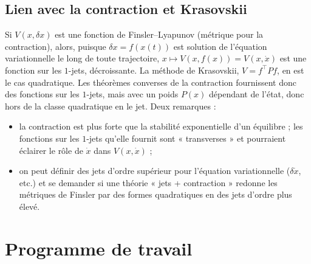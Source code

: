 \documentclass[11pt,a4paper]{article}
\theoremstyle{definition}
\theoremstyle{remark}
\newcommand{\tr}{^{\top}}
\begin{document}
\subsection{Lien avec la contraction et Krasovskii}
Si $V(x,\delta x)$ est une fonction de Finsler–Lyapunov \cite{FS,AJP} (métrique pour la contraction), alors, puisque $\delta x = f(x(t))$ est solution de l'équation variationnelle le long de toute trajectoire, $x\mapsto V(x,f(x)) = V(x,\dot x)$ est une fonction sur les $1$-jets, décroissante. La méthode de Krasovskii, $V = f\tr Pf$, en est le cas quadratique. Les théorèmes converses de la contraction fournissent donc des fonctions sur les $1$-jets, mais avec un poids $P(x)$ dépendant de l'état, donc hors de la classe quadratique en le jet. Deux remarques :
\begin{itemize}[nosep]
\item la contraction est plus forte que la stabilité exponentielle d'un équilibre ; les fonctions sur les $1$-jets qu'elle fournit sont « transverses » et pourraient éclairer le rôle de $\dot x$ dans $V(x,\dot x)$ ;
\item on peut définir des jets d'ordre supérieur pour l'équation variationnelle ($\delta\dot x$, etc.) et se demander si une théorie « jets + contraction » redonne les métriques de Finsler par des formes quadratiques en des jets d'ordre plus élevé.
\end{itemize}

\section{Programme de travail}
\end{document}
